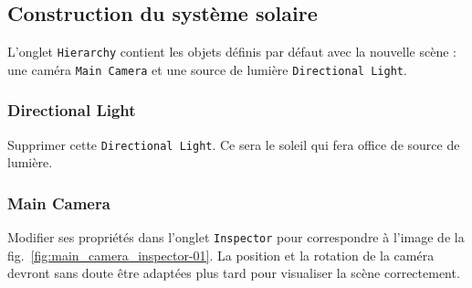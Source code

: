 \documentclass[a4paper,10pt]{article}
\newenvironment{solution}%
{\begin{tcolorbox}[breakable,colback=red!5!white,colframe=red!75!black,title=Solution]}%
{\end{tcolorbox}}
\begin{document}
\ifversionenseignant
\begin{solution}
\subsection{Construction du système solaire}

L'onglet \texttt{Hierarchy} contient les objets définis par défaut avec la nouvelle scène : une caméra \texttt{Main Camera} et une source de lumière \texttt{Directional Light}.

\subsubsection{Directional Light}

Supprimer cette \texttt{Directional Light}. Ce sera le soleil qui fera office de source de lumière.

\subsubsection{Main Camera}

Modifier ses propriétés dans l'onglet \texttt{Inspector} pour correspondre à l'image de la fig.~\ref{fig:main_camera_inspector-01}. La position et la rotation de la caméra devront sans doute être adaptées plus tard pour visualiser la scène correctement.
\end{solution}
\end{document}
